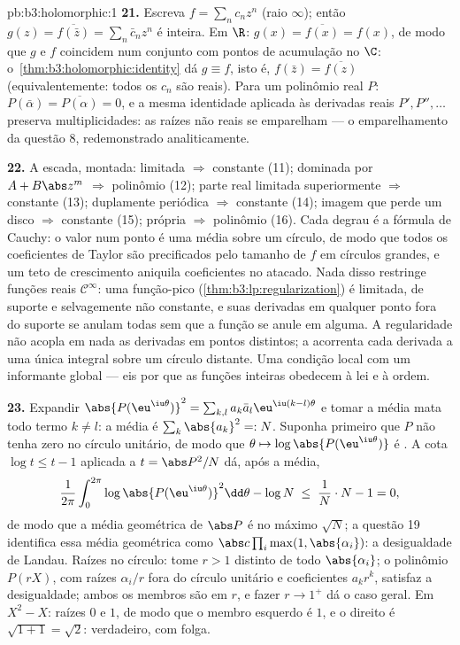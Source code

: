 \begin{solution}{pb:b3:holomorphic:1}
\textbf{21.} Escreva $f = \sum_nc_nz^n$ (raio $\infty$);
então $g(z) = \overline{f(\bar z)} = \sum_n\bar c_nz^n$ é
inteira. Em $\R$: $g(x) = \overline{f(x)} = f(x)$, de modo que $g$ e
$f$ coincidem num conjunto com pontos de acumulação no 
$\C$: o~\cref{thm:b3:holomorphic:identity} dá $g \equiv f$,
isto é, $f(\bar z) = \overline{f(z)}$ (equivalentemente: todos os
$c_n$ são reais). Para um polinômio real $P$:
$P(\bar\alpha) = \overline{P(\alpha)} = 0$, e a mesma
identidade aplicada às derivadas reais $P', P'', \dots$
preserva multiplicidades: as raízes não reais se emparelham ---
o emparelhamento da questão 8, redemonstrado analiticamente.

\textbf{22.} A escada, montada: limitada $\Rightarrow$
constante (11); dominada por $A + B\abs z^m$ $\Rightarrow$
polinômio (12); parte real limitada superiormente $\Rightarrow$
constante (13); duplamente periódica $\Rightarrow$ constante (14);
imagem que perde um disco $\Rightarrow$ constante (15); própria
$\Rightarrow$ polinômio (16). Cada degrau é a fórmula de
Cauchy: o valor num ponto é uma média sobre um círculo, de modo que todos
os coeficientes de Taylor são precificados pelo tamanho de $f$ em círculos
grandes, e um teto de crescimento aniquila coeficientes
no atacado. Nada disso restringe funções reais $\mathcal
C^\infty$: uma função-pico
(\cref{thm:b3:lp:regularization}) é limitada, de suporte
 e selvagemente não constante, e suas derivadas em qualquer
ponto fora do suporte se anulam todas sem que a função
se anule em  alguma. A regularidade não acopla em nada as derivadas
em pontos distintos; a  acorrenta cada
derivada a uma única integral sobre um círculo distante. Uma
condição local com um informante global --- eis por que as
funções inteiras obedecem à lei e à ordem.

\textbf{23.} Expandir
$\abs{P(\eu^{\iu\theta})}^2 = \sum_{k,l}a_k\bar a_l
\eu^{\iu(k-l)\theta}$ e tomar a média mata todo termo $k \neq
l$: a média é $\sum_k\abs{a_k}^2 =: N$. Suponha primeiro que
$P$ não tenha zero no círculo unitário, de modo que $\theta \mapsto
\log\abs{P(\eu^{\iu\theta})}$ é . A cota $\log
t \leq t - 1$ aplicada a $t = \abs P^2/N$ dá, após a
média,
\[
\frac1{2\pi}\int_0^{2\pi}\log\abs{P(\eu^{\iu\theta})}^2
\dd\theta - \log N
\;\leq\; \frac1N\cdot N - 1 = 0,
\]
de modo que a média geométrica de $\abs P$ é no máximo $\sqrt N$;
a questão 19 identifica essa média geométrica como
$\abs c\prod_i\max(1, \abs{\alpha_i})$: a desigualdade de Landau.
Raízes no círculo: tome $r > 1$ distinto de
todo $\abs{\alpha_i}$; o polinômio $P(rX)$, com raízes
$\alpha_i/r$ fora do círculo unitário e coeficientes $a_kr^k$,
satisfaz a desigualdade; ambos os membros são  em $r$,
e fazer $r \to 1^+$ dá o caso geral. Em $X^2 -
X$: raízes $0$ e $1$, de modo que o membro esquerdo é $1$, e o
direito é $\sqrt{1 + 1} = \sqrt2$: verdadeiro, com folga.


\end{solution}
